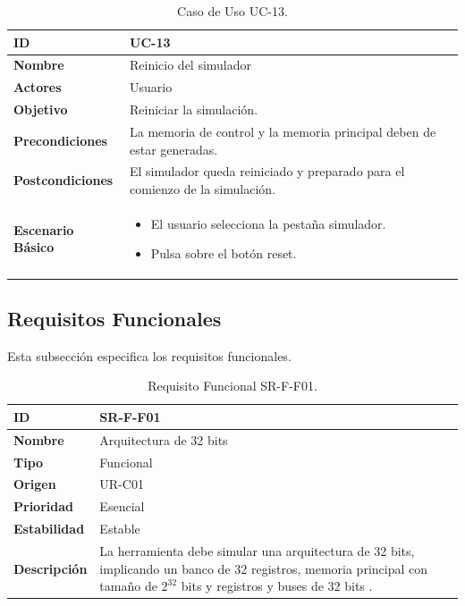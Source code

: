 \begin{center}
\begin{table}[htbp]
\centering
\begin{tabular}{@{}p{2.5cm} p{9cm}@{}} 
\toprule
\textbf{ID}	& UC-13  \\
\midrule
\textbf{Nombre} 		& Reinicio del simulador  \\
\midrule
\textbf{Actores} 		&	Usuario  \\
\midrule
\textbf{Objetivo} 	&	Reiniciar la simulación.	 \\
\midrule
\textbf{Precondiciones}	&	La memoria de control y la memoria principal deben de estar generadas.  \\
\midrule
\textbf{Postcondiciones} 	& El simulador queda reiniciado y preparado para el comienzo de la simulación.   \\
\midrule
\textbf{Escenario Básico} 	&  \begin{itemize}
\item El usuario selecciona la pestaña simulador.
\item Pulsa sobre el botón reset.
\end{itemize} \\
\bottomrule
\end{tabular}
\caption{Caso de Uso UC-13.}
\label{tab:uc13}
\end{table}
\end{center}


\clearpage
\subsection{Requisitos Funcionales}

Esta subsección especifica los requisitos funcionales.

\begin{center}
\begin{table}[htbp]
\centering
\begin{tabular}{@{}p{2.5cm} p{9cm}@{}} 
\toprule
\textbf{ID} 				& SR-F-F01 \\
\midrule
\textbf{Nombre} 			& Arquitectura de 32 bits \\
\midrule
\textbf{Tipo} 			& Funcional \\
\midrule
\textbf{Origen} 			& UR-C01 \\
\midrule
\textbf{Prioridad}		& Esencial \\
\midrule
\textbf{Estabilidad} 		& Estable \\
\midrule
\textbf{Descripción} 	& La herramienta debe simular una arquitectura de 32 bits, implicando un banco de 32 registros, memoria principal con tamaño de  $2^{32}$ bits y registros y buses de 32 bits . \\
\bottomrule
\end{tabular}
\caption{Requisito Funcional SR-F-F01.}
\label{tab:srff01}
\end{table}
\end{center}

